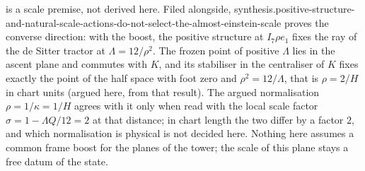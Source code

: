 is a scale premise, not derived here. Filed alongside, synthesis.positive-structure-and-natural-scale-actions-do-not-select-the-almost-einstein-scale proves the converse direction: with the boost, the positive structure at $I_{7}\rho e_{1}$ fixes the ray of the de Sitter tractor at $\Lambda = 12/\rho^{2}$. The frozen point of positive $\Lambda$ lies in the ascent plane and commutes with $K$, and its stabiliser in the centraliser of $K$ fixes exactly the point of the half space with foot zero and $\rho^{2} = 12/\Lambda$, that is $\rho = 2/H$ in chart units (argued here, from that result). The argued normalisation $\rho = 1/\kappa = 1/H$ agrees with it only when read with the local scale factor $\sigma = 1 - \Lambda Q/12 = 2$ at that distance; in chart length the two differ by a factor $2$, and which normalisation is physical is not decided here. Nothing here assumes a common frame boost for the planes of the tower; the scale of this plane stays a free datum of the state.
